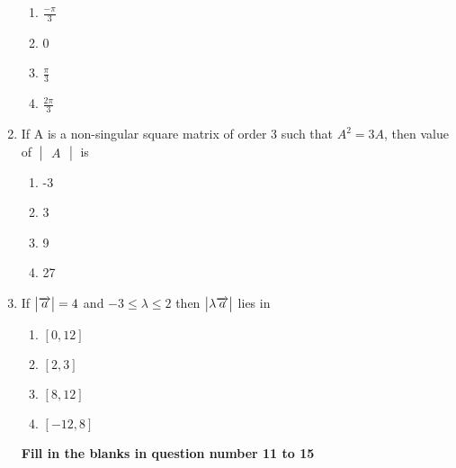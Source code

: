 \documentclass[journal,12pt,twocolumn]{IEEEtran}
\renewcommand\thesection{\arabic{section}}
\begin{document}
\begin{enumerate}[label=\thesection.\arabic*.,ref=\thesection.\theenumi]
\begin{enumerate}
    \item $\frac{-\pi}{3}$
    \item 0
    \item $\frac{\pi}{3}$
    \item $\frac{2\pi}{3}$
\end{enumerate}

\item  If A is a non-singular square matrix of order 3 such that $ A^2 =3A $, then value of  $\begin{vmatrix}A \end{vmatrix}$ is

\begin{enumerate}
    \item -3
     \item 3
     \item 9
     \item 27
\end{enumerate}
\item  If $\begin{vmatrix}\overrightarrow{a}\end{vmatrix} = 4 $ and  $ -3\leq \lambda \leq 2 $ then $\begin{vmatrix}\lambda \overrightarrow{a}\end{vmatrix} $ lies in

\begin{enumerate}
    \item $\left[0,12\right]$
    \item $\left[2,3\right]$
    \item $\left[8,12\right]$
    \item $\left[-12,8\right]$
\end{enumerate}
\pagebreak
\textbf{Fill in the blanks in question number 11 to 15}\\


\end{enumerate}
\end{document}
